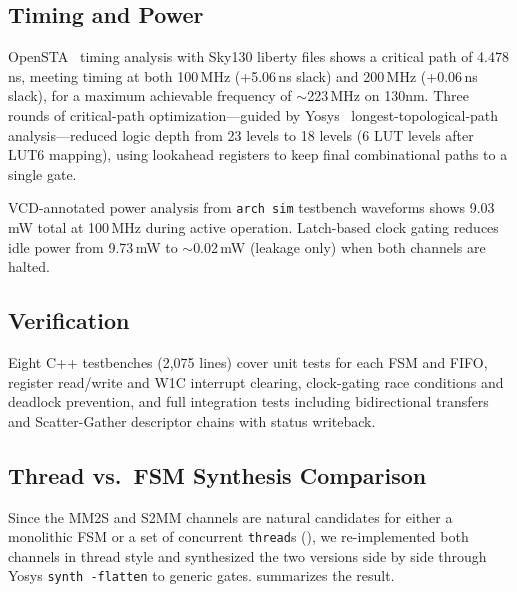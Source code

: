 \documentclass[11pt,twocolumn]{article}
\begin{document}
\subsection{Timing and Power}

OpenSTA~\cite{opensta} timing analysis with Sky130 liberty files shows a critical path of 4.478\,ns, meeting timing at both 100\,MHz (+5.06\,ns slack) and 200\,MHz (+0.06\,ns slack), for a maximum achievable frequency of ${\sim}$223\,MHz on 130nm. Three rounds of critical-path optimization---guided by Yosys~\cite{yosys} longest-topological-path analysis---reduced logic depth from 23 levels to 18 levels (6 LUT levels after LUT6 mapping), using lookahead registers to keep final combinational paths to a single gate.

VCD-annotated power analysis from \texttt{arch sim} testbench waveforms shows 9.03\,mW total at 100\,MHz during active operation. Latch-based clock gating reduces idle power from 9.73\,mW to ${\sim}$0.02\,mW (leakage only) when both channels are halted.

\subsection{Verification}

Eight C++ testbenches (2,075 lines) cover unit tests for each FSM and FIFO, register read/write and W1C interrupt clearing, clock-gating race conditions and deadlock prevention, and full integration tests including bidirectional transfers and Scatter-Gather descriptor chains with status writeback.

\subsection{Thread vs.\ FSM Synthesis Comparison}\label{sec:thread-vs-fsm}

Since the MM2S and S2MM channels are natural candidates for either a monolithic FSM or a set of concurrent \texttt{thread}s (), we re-implemented both channels in thread style and synthesized the two versions side by side through Yosys \texttt{synth -flatten} to generic gates.  summarizes the result.
\end{document}
